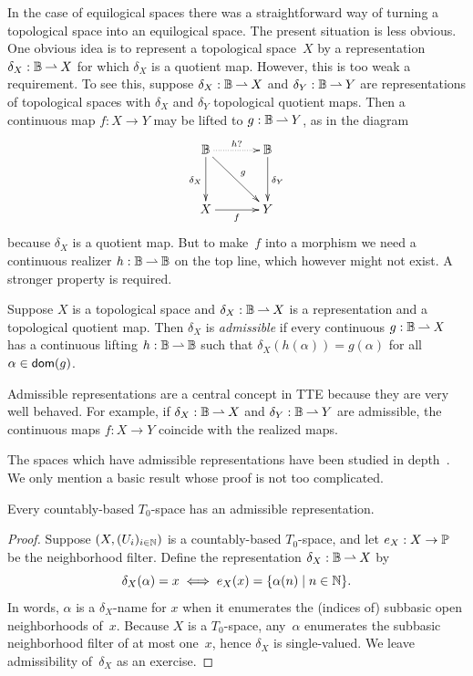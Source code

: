 In the case of equilogical spaces there was a straightforward way of
turning a topological space into an equilogical space. The present
situation is less obvious. One obvious idea is to represent a
topological space~$X$ by a representation $\delta_X : \mathbb{B} \mathbin{\rightharpoonup} X$
for which $\delta_X$ is a quotient map. However, this is too weak a
requirement. To see this, suppose $\delta_X : \mathbb{B} \mathbin{\rightharpoonup} X$ and
$\delta_Y : \mathbb{B} \mathbin{\rightharpoonup} Y$ are representations of topological spaces
with $\delta_X$ and $\delta_Y$ topological quotient maps. Then a
continuous map $f : X \to Y$ may be lifted to $g : \mathbb{B} \mathbin{\rightharpoonup} Y$,
as in the diagram
%
\begin{equation*}
  \xymatrix@+1em{
    {\Baire}
    \ar[d]_{\delta_X}
    \ar[dr]^{g}
    \ar@{..>}[r]^{h?}
    &
    {\Baire}
    \ar[d]^{\delta_Y}
    \\
    {X}
    \ar[r]_f
    &
    {Y}
  }
\end{equation*}
%
because $\delta_X$ is a quotient map. But to make~$f$ into a morphism
we need a continuous realizer $h : \mathbb{B} \mathbin{\rightharpoonup} \mathbb{B}$ on the top
line, which however might not exist. A stronger property is required.

\begin{definition}
  Suppose $X$ is a topological space and $\delta_X : \mathbb{B} \mathbin{\rightharpoonup} X$
  is a representation and a topological quotient map. Then $\delta_X$
  is \emph{admissible} if every continuous $g : \mathbb{B} \mathbin{\rightharpoonup} X$ has a
  continuous lifting $h : \mathbb{B} \mathbin{\rightharpoonup} \mathbb{B}$ such that
  $\delta_X(h(\alpha)) = g(\alpha)$ for all $\alpha \in \mathsf{dom}(g)$.
\end{definition}

Admissible representations are a central concept in TTE because they
are very well behaved. For example, if $\delta_X : \mathbb{B} \mathbin{\rightharpoonup} X$
and $\delta_Y : \mathbb{B} \mathbin{\rightharpoonup} Y$ are admissible, the continuous maps
$f : X \to Y$ coincide with the realized maps.

The spaces which have admissible representations have been studied in
depth~\cite{Schroeder,Weihrauch}. We only mention a basic result whose
proof is not too complicated.

\begin{proposition}
  Every countably-based $T_0$-space has an admissible representation.
\end{proposition}

\begin{proof}
  Suppose $(X, (U_i)_{i \in \mathbb{N}})$ is a countably-based $T_0$-space,
  and let $e_X : X \to \mathbb{P}$ be the neighborhood filter. Define the
  representation $\delta_X : \mathbb{B} \mathbin{\rightharpoonup} X$ by
  \begin{equation*}
    \delta_X(\alpha) = x \iff
    e_X(x) = \{\alpha(n) \mid n \in \mathbb{N}\}.
  \end{equation*}
  In words, $\alpha$ is a $\delta_X$-name for $x$ when it enumerates
  the (indices of) subbasic open neighborhoods of~$x$. Because $X$ is
  a $T_0$-space, any~$\alpha$ enumerates the subbasic neighborhood
  filter of at most one~$x$, hence $\delta_X$ is single-valued. We
  leave admissibility of~$\delta_X$ as an exercise.
\end{proof}


